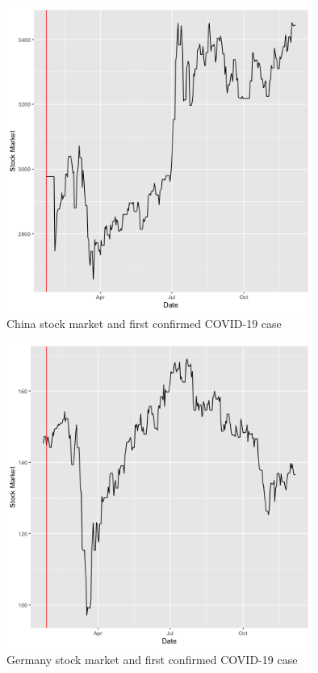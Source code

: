 \documentclass[11pt]{article}
\begin{document}
\begin{figure}[h!]
\centering
  \includegraphics[width=100mm]{R-Code/plots/chinaFinance.png} 
  \caption{China stock market and first confirmed COVID-19 case}
  \label{china-covid-market}
\end{figure}

\begin{figure}[!h]
\centering
  \includegraphics[width=100mm]{R-Code/plots/germanyFinance.png}   
  \caption{Germany stock market and first confirmed COVID-19 case}
  \label{germany-covid-market}
\end{figure}
\end{document}
